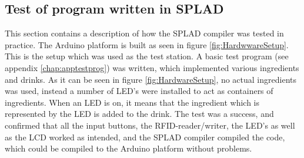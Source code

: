\subsection{Test of program written in SPLAD}
This section contains a description of how the SPLAD compiler was tested in practice. The Arduino platform is built as seen in figure \ref{fig:HardwwareSetup}. This is the setup which was used as the test station. A basic test program (see appendix \ref{chap:apptestprog}) was written, which implemented various ingredients and drinks. As it can be seen in figure \ref{fig:HardwareSetup}, no actual ingredients was used, instead a number of LED's were installed to act as containers of ingredients. When an LED is on, it means that the ingredient which is represented by the LED is added to the drink. The test was a success, and confirmed that all the input buttons, the RFID-reader/writer, the LED's as well as the LCD worked as intended, and the SPLAD compiler compiled the code, which could be compiled to the Arduino platform without problems.